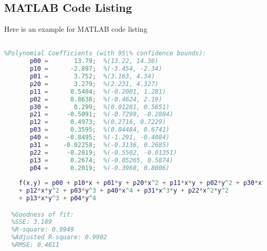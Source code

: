 \begin{appendix}
\vfill


\pagebreak


\section{MATLAB Code Listing}
Here is an example for MATLAB code listing

\vfill

\begin{lstlisting}[language=MATLAB,title=MATLAB Listing Title]
%% Linear model Poly44 from MATLAB Curve Fit App:

%Polynomial Coefficients (with 95\% confidence bounds):
       p00 =       13.79;  %(13.22, 14.36)
       p10 =      -2.897;  %(-3.454, -2.34)
       p01 =       3.752;  %(3.163, 4.34)
       p20 =       3.279;  %(2.231, 4.327)
       p11 =      0.5404;  %(-0.2001, 1.281)
       p02 =      0.8638;  %(-0.4624, 2.19)
       p30 =       0.299;  %(0.01281, 0.5851)
       p21 =     -0.5091;  %(-0.7299, -0.2884)
       p12 =      0.4973;  %(0.2716, 0.7229)
       p03 =      0.3595;  %(0.04484, 0.6741)
       p40 =     -0.8495;  %(-1.291, -0.4084)
       p31 =    -0.02258;  %(-0.3136, 0.2685)
       p22 =     -0.2819;  %(-0.5502, -0.01351)
       p13 =      0.2674;  %(-0.05265, 0.5874)
       p04 =      0.2019;  %(-0.3968, 0.8006)
       
  	f(x,y) = p00 + p10*x + p01*y + p20*x^2 + p11*x*y + p02*y^2 + p30*x^3 + p21*x^2*y 
  	+ p12*x*y^2 + p03*y^3 + p40*x^4 + p31*x^3*y + p22*x^2*y^2 
  	+ p13*x*y^3 + p04*y^4

  %Goodness of fit:
  %SSE: 3.189
  %R-square: 0.9949
  %Adjusted R-square: 0.9902
  %RMSE: 0.4611
\end{lstlisting}

\vfill

\end{appendix}
